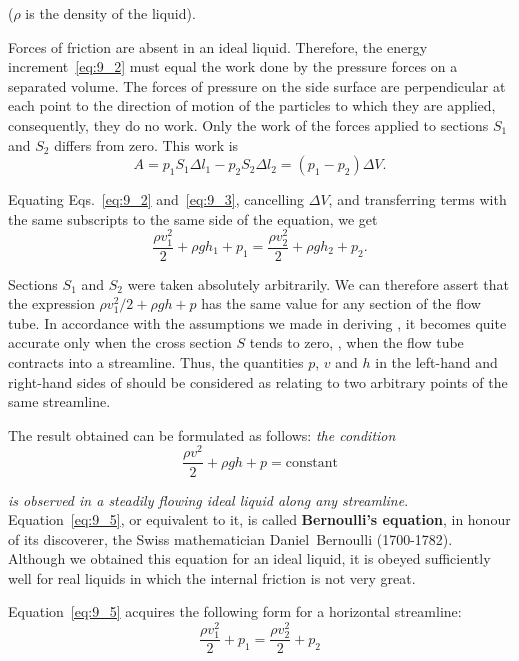 \noindent
($\rho$ is the density of the liquid).

Forces of friction are absent in an ideal liquid. Therefore, the energy increment~\eqref{eq:9_2} must equal the work done by the pressure forces on a separated volume. The forces of pressure on the side surface are perpendicular at each point to the direction of motion of the particles to which they are applied, consequently, they do no work. Only the work of the forces applied to sections $S_1$ and $S_2$ differs from zero. This work is
\begin{equation}\label{eq:9_3}
	A = p_1 S_1 \Delta l_1 - p_2 S_2 \Delta l_2 = (p_1 - p_2)\Delta V.
\end{equation}

Equating Eqs.~\eqref{eq:9_2} and~\eqref{eq:9_3}, cancelling $\Delta V$, and transferring terms with the same subscripts to the same side of the equation, we get
\begin{equation}\label{eq:9_4}
	\frac{\rho v_1^2}{2} + \rho gh_1 + p_1 = \frac{\rho v_2^2}{2} + \rho gh_2 + p_2.
\end{equation}

\noindent
Sections $S_1$ and $S_2$ were taken absolutely arbitrarily. We can therefore assert that the expression $\rho v_1^2/2+\rho gh+p$ has the same value for any section of the flow tube. In accordance with the assumptions we made in deriving , it becomes quite accurate only when the cross section $S$ tends to zero, \ie, when the flow tube contracts into a streamline. Thus, the quantities $p$, $v$ and $h$ in the left-hand and right-hand sides of  should be considered as relating to two arbitrary points of the same streamline.

The result obtained can be formulated as follows: \textit{the condition}
\begin{equation}\label{eq:9_5}
	\frac{\rho v^2}{2} + \rho gh + p = \text{constant}
\end{equation}

\noindent
\textit{is observed in a steadily flowing ideal liquid along any streamline}. Equation~\eqref{eq:9_5}, or  equivalent to it, is called \textbf{Bernoulli's equation}, in honour of its discoverer, the Swiss mathematician Daniel~Bernoulli (1700-1782). Although we obtained this equation for an ideal liquid, it is obeyed sufficiently well for real liquids in which the internal friction is not very great.

Equation~\eqref{eq:9_5} acquires the following form for a horizontal streamline:
\begin{equation*}
	\frac{\rho v_1^2}{2} + p_1 = \frac{\rho v_2^2}{2} + p_2
\end{equation*}

